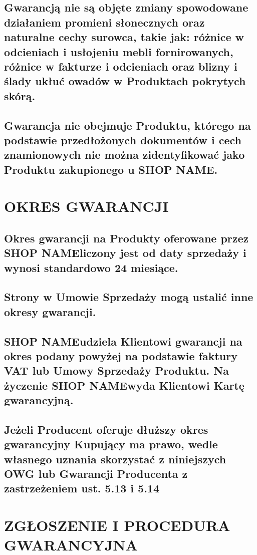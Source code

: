 \documentclass[10pt,a4paper]{article}
\newcommand{\shopname}{SHOP NAME}
\begin{document}
\subsection{Gwarancją nie są objęte zmiany spowodowane działaniem promieni słonecznych oraz naturalne cechy surowca, takie jak: różnice w
odcieniach i usłojeniu mebli fornirowanych, różnice w fakturze i odcieniach oraz blizny i ślady ukłuć owadów w Produktach pokrytych skórą.}

\subsection{Gwarancja nie obejmuje Produktu, którego na podstawie przedłożonych dokumentów i cech znamionowych nie można zidentyfikować jako Produktu zakupionego u \shopname.}

\section{OKRES GWARANCJI}

\subsection{Okres gwarancji na Produkty oferowane przez \shopname liczony jest od daty sprzedaży i wynosi standardowo 24 miesiące.}
\subsection{Strony w Umowie Sprzedaży mogą ustalić inne okresy gwarancji.}

\subsection{\shopname udziela Klientowi gwarancji na okres podany powyżej na podstawie faktury VAT lub Umowy Sprzedaży Produktu. Na życzenie \shopname wyda Klientowi Kartę gwarancyjną.}

\subsection{Jeżeli Producent oferuje dłuższy okres gwarancyjny Kupujący ma prawo, wedle własnego uznania skorzystać z niniejszych OWG lub
Gwarancji Producenta z zastrzeżeniem ust. 5.13 i 5.14}

\section{ZGŁOSZENIE I PROCEDURA GWARANCYJNA}
\end{document}
